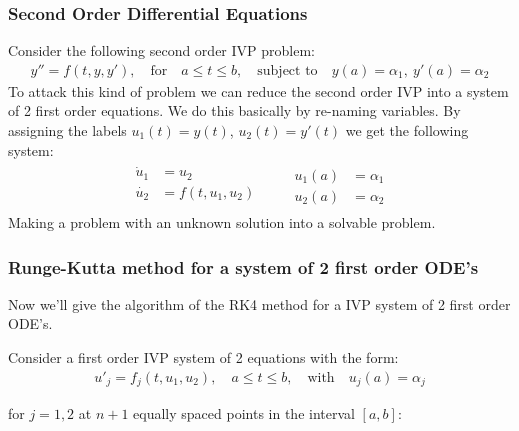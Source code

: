 \documentclass[12pt,twoside]{extarticle}
\begin{document}
\subsubsection{Second Order Differential Equations}
    Consider the following second order IVP problem:
    \begin{align*}
        y''=f(t,y,y'), \quad \text{for} \quad a \leq t \leq b, \quad \text{subject to} \quad y(a)=\alpha_1, \ y'(a)=\alpha_2
    \end{align*}
    To attack this kind of problem we can reduce the second order IVP into a system of 2 first order
    equations. We do this basically by re-naming variables. By assigning the labels $u_1(t)=y(t)$, $u_2(t)=y'(t)$ we get the following system:
    \begin{align*}
        \begin{aligned}%
            \dot{u}_1 &= u_2 \\
            \dot{u_2} &= f(t,u_1,u_2) \\
        \end{aligned}
        \quad\quad
        \begin{aligned}%
            u_1(a) &= \alpha_1 \\
            u_2(a) &= \alpha_2 
        \end{aligned}
    \end{align*}
    Making a problem with an unknown solution into a solvable problem.

\subsubsection{Runge-Kutta method for a system of 2 first order ODE's}
Now we'll give the algorithm of the RK4 method for a IVP system of 2 first order ODE's. 

Consider a first order IVP system of 2 equations with the form:
\begin{align*}
    u'_j=f_j(t,u_1,u_2), \quad a \leq t \leq b, \quad \text{with} \quad u_j(a)=\alpha_j
\end{align*}

for $j=1,2$ at $n+1$ equally spaced points in the interval $[a,b]$:\par
\end{document}
